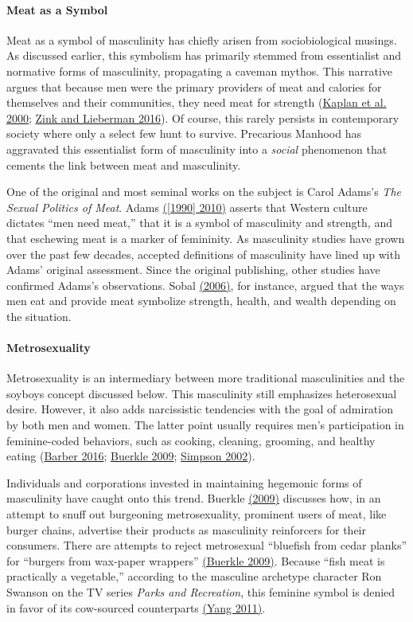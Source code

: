 \documentclass[twoside]{report}
\begin{document}
\begin{multicols*}{2}
\paragraph{Meat as a Symbol}

Meat as a symbol of masculinity has chiefly arisen from sociobiological
musings. As discussed earlier, this symbolism has primarily stemmed from essentialist and normative forms of masculinity, propagating a caveman mythos. This narrative argues that because men were the primary providers of meat and calories for themselves and their communities, they need meat for strength (\hyperlink{kaplan}{Kaplan et al. 2000}; \hyperlink{zink}{Zink and Lieberman 2016}). Of course, this rarely persists in contemporary society where only a select few hunt to survive. Precarious Manhood has aggravated this essentialist form of masculinity into a \textit{social} phenomenon that cements the link between meat and masculinity.

One of the original and most seminal works on the subject is Carol Adams's \emph{The Sexual Politics of Meat}. Adams \hyperlink{adams}{([1990] 2010)} asserts that Western culture dictates ``men need meat,'' that it is a symbol of masculinity and strength, and that eschewing meat is a marker of femininity. As masculinity studies have grown over the past few decades, accepted definitions of masculinity have lined up with Adams' original assessment. Since the original publishing, other studies have confirmed Adams's observations. Sobal \hyperlink{sobal}{(2006)}, for instance, argued that the ways men eat and provide meat symbolize strength, health, and wealth depending on the situation.

\paragraph{Metrosexuality}
Metrosexuality is an intermediary between more traditional masculinities
and the soyboys concept discussed below. This masculinity still
emphasizes heterosexual desire. However, it also adds narcissistic
tendencies with the goal of admiration by both men and women. The latter
point usually requires men's participation in feminine-coded behaviors,
such as cooking, cleaning, grooming, and healthy eating (\hyperlink{barber1}{Barber 2016}; \hyperlink{buerkle}{Buerkle 2009}; \hyperlink{simpson}{Simpson 2002}).


Individuals and corporations invested in maintaining hegemonic forms of
masculinity have caught onto this trend. Buerkle \hyperlink{buerkle}{(2009)} discusses how, in an attempt to snuff out burgeoning metrosexuality, prominent users of meat, like burger chains, advertise their products as masculinity
reinforcers for their consumers. There are attempts to reject
metrosexual ``bluefish from cedar planks'' for ``burgers from wax-paper
wrappers'' \hyperlink{buerkle}{(Buerkle 2009)}. Because ``fish meat is practically a vegetable,'' according to the masculine archetype character Ron Swanson on the TV series \emph{Parks and Recreation}, this feminine symbol is denied in favor of
its cow-sourced counterparts \hyperlink{yang}{(Yang 2011)}.


\end{multicols*}
\end{document}

